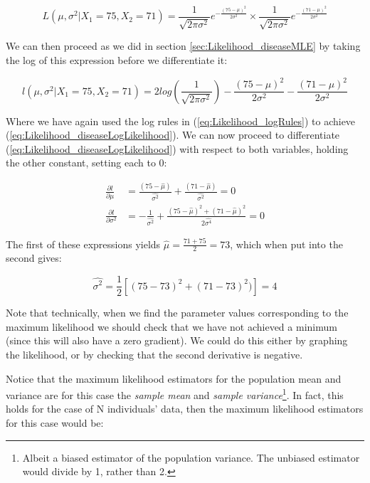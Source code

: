 \documentclass[11pt,fullpage]{book}
\begin{document}
\begin{equation}\label{eq:Likelihood_normalTwo}
L(\mu,\sigma^2|X_1=75,X_2 =71) = \frac{1}{\sqrt{2\pi\sigma^2}}e^{-\frac{(75-\mu)^2}{2\sigma^2}}\times \frac{1}{\sqrt{2\pi\sigma^2}}e^{-\frac{(71-\mu)^2}{2\sigma^2}}
\end{equation}

We can then proceed as we did in section \ref{sec:Likelihood_diseaseMLE} by taking the log of this expression before we differentiate it:

\begin{equation}\label{eq:Likelihood_diseaseLogLikelihood}
l(\mu,\sigma^2|X_1=75,X_2 =71) = 2log\left(\frac{1}{\sqrt{2\pi\sigma^2}}\right)-{\frac{(75-\mu)^2}{2\sigma^2}}-{\frac{(71-\mu)^2}{2\sigma^2}}
\end{equation}

Where we have again used the log rules in (\ref{eq:Likelihood_logRules}) to achieve (\ref{eq:Likelihood_diseaseLogLikelihood}). We can now proceed to differentiate (\ref{eq:Likelihood_diseaseLogLikelihood}) with respect to both variables, holding the other constant, setting each to 0:

\begin{equation}\label{eq:Likelihood_diseaseDerivativeOne}
\begin{align}
\frac{\partial l}{\partial \mu} &= {\frac{(75-\hat{\mu})}{\hat{\sigma^2}}}+{\frac{(71-\hat{\mu})}{\hat{\sigma^2}}} = 0\\
\frac{\partial l}{\partial \sigma^2} &= -\frac{1}{\hat{\sigma^2}} + \frac{(75-\hat{\mu})^2+(71-\hat{\mu})^2}{2\hat{\sigma^4}} = 0
\end{align}
\end{equation}

The first of these expressions yields $\hat{\mu} = \frac{71+75}{2} = 73$, which when put into the second gives: 

\begin{equation}
\hat{\sigma^2} = \frac{1}{2}\left[(75-73)^2 + (71-73)^2)\right] = 4
\end{equation}

Note that technically, when we find the parameter values corresponding to the maximum likelihood we should check that we have not achieved a minimum (since this will also have a zero gradient). We could do this either by graphing the likelihood, or by checking that the second derivative is negative.

Notice that the maximum likelihood estimators for the population mean and variance are for this case the \textit{sample mean} and \textit{sample variance}\footnote{Albeit a biased estimator of the population variance. The unbiased estimator would divide by 1, rather than 2.}. In fact, this holds for the case of N individuals' data, then the maximum likelihood estimators for this case would be:
\end{document}
